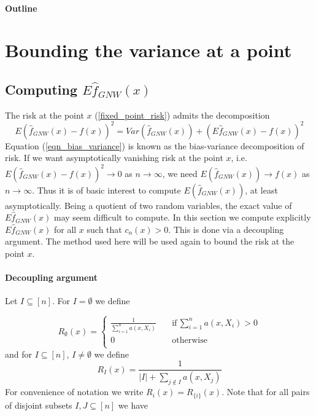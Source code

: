 \documentclass{article}
\begin{document}
\paragraph{Outline}

\section{Bounding the variance at a point}
\subsection{Computing  $E\hat{f}_{GNW}(x)$}
The risk at the point $x$ (\ref{fixed_point_risk}) admits the decomposition
\begin{equation}
\label{eqn_bias_variance}
    E(\hat{f}_{GNW}(x)-f(x))^2=Var(\hat{f}_{GNW}(x))+(E\hat{f}_{GNW}(x)-f(x))^2
\end{equation}
Equation (\ref{eqn_bias_variance}) is known as the bias-variance decomposition of risk. If we want asymptotically vanishing risk at the point $x$, i.e. 
$E(\hat{f}_{GNW}(x)-f(x))^2\rightarrow 0$ as $n\rightarrow\infty$, we need  $E(\hat{f}_{GNW}(x))\rightarrow f(x)$ as $n\rightarrow\infty$. Thus it is of basic interest to compute $E(\hat{f}_{GNW}(x))$, at least asymptotically. Being a quotient of two random variables, the exact value of 
$E\hat{f}_{GNW}(x)$ may seem difficult to compute. 
In this section we compute explicitly  $E\hat{f}_{GNW}(x)$ for all $x$ such that $c_n(x)>0$. This is done via a decoupling argument. The method used here will be used again to bound the risk at the point $x$.

\paragraph{Decoupling argument}

Let $I\subseteq [n]$.
For $I=\emptyset$ we define

\begin{equation}
\label{eqn_R_empty}
R_{\emptyset}(x)=\begin{cases}
    \frac{1}{\sum_{i=1}^n a(x,X_i)} \quad &\text{if}\, \sum_{i=1}^n a(x,X_i)>0\\
    0 \quad &\text{otherwise}\\
\end{cases}
\end{equation}
 and for $I\subseteq [n]$, $I\neq\emptyset$ we define  
\begin{equation*}
    R_I(x)=\frac{1}{|I|+\sum_{j\notin I}a(x,X_j)}
\end{equation*}
For convenience of notation we write $R_i(x)=R_{\{i\}}(x)$.
Note that for all pairs of disjoint subsets $I,J\subseteq [n]$ we have
\end{document}
